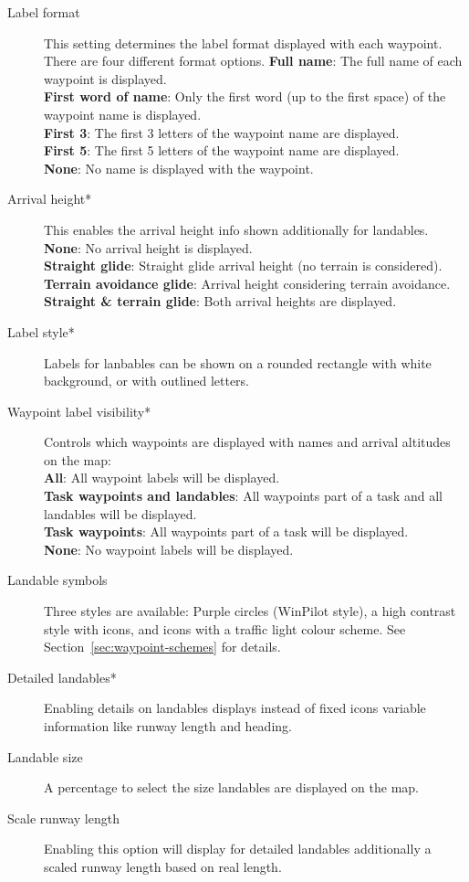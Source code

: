 \begin{description}
\item[Label format]  This setting \label{conf:labels} determines the label format 
  displayed with each waypoint. There are four different format options.
  {\bf Full name}: The full name of each waypoint is displayed. \\
  {\bf First word of name}: Only the first word (up to the first space) of the 
  waypoint name is displayed. \\
  {\bf First 3}: The first 3 letters of the waypoint name are displayed. \\
  {\bf First 5}: The first 5 letters of the waypoint name are displayed. \\
  {\bf None}: No name is displayed with the waypoint.
\item[Arrival height*]  This enables the arrival height info shown additionally 
  for landables. \\
  {\bf None}: No arrival height is displayed. \\
  {\bf Straight glide}: Straight glide arrival height (no terrain is considered). \\
  {\bf Terrain avoidance glide}: Arrival height considering terrain avoidance. \\
  {\bf Straight \& terrain glide}: Both arrival heights are displayed.
\item[Label style*]  Labels for lanbables can be shown on a rounded rectangle with 
  white background, or with outlined letters.
\item[Waypoint label visibility*]  \label{conf:labelvisibility} Controls which waypoints 
  are displayed with names and arrival altitudes on the map: \\
  {\bf All}: All waypoint labels will be displayed. \\
  {\bf Task waypoints and landables}: All waypoints part of a task and all landables 
  will be displayed. \\
  {\bf Task waypoints}: All waypoints part of a task will be displayed. \\
  {\bf None}:  No waypoint labels will be displayed.
\item[Landable symbols]  \label{conf:waypointicons} Three styles are available:
  Purple circles (WinPilot style), a high contrast style with icons,
  and icons with a traffic light colour scheme. See Section~\ref{sec:waypoint-schemes} for details.
\item[Detailed landables*]  Enabling details on landables displays instead of fixed icons 
  variable information like runway length and heading.
\item[Landable size]  A percentage to select the size landables are displayed on the map.
\item[Scale runway length]  Enabling this option will display for detailed landables 
  additionally a scaled runway length based on real length.
\end{description}


